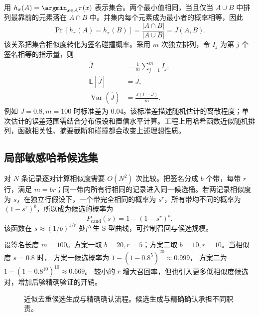 \documentclass[../textbook.tex]{subfiles}
\begin{document}
用 $h_\pi(A)=\argmin_{x\in A}\pi(x)$ 表示集合。两个最小值相同，当且仅当 $A\cup B$ 中排列最靠前的元素落在 $A\cap B$ 中。并集内每个元素成为最小者的概率相等，因此
\begin{equation}
\Pr[h_\pi(A)=h_\pi(B)]=\frac{|A\cap B|}{|A\cup B|}=J(A,B).
\label{eq:data-minhash}
\end{equation}
该关系把集合相似度转化为签名碰撞概率\cite{broder1997resemblance}。采用 $m$ 次独立排列，令 $I_j$ 为第 $j$ 个签名相等的指示量，则
\begin{equation}
 \begin{aligned}
  \widehat J &= \frac{1}{m}\sum_{j=1}^{m}I_j, \\
  \mathbb E[\widehat J] &= J, \\
  \operatorname{Var}(\widehat J) &= \frac{J(1-J)}{m}.
 \end{aligned}
\end{equation}
例如 $J=0.8,m=100$ 时标准差为 $0.04$。该标准差描述随机估计的离散程度；单次估计的误差范围需结合分布假设和置信水平计算。工程上用哈希函数近似随机排列，函数相关性、摘要截断和碰撞都会改变上述理想性质。

\subsection{局部敏感哈希候选集}
对 $N$ 条记录逐对计算相似度需要 $O(N^2)$ 次比较。把签名分成 $b$ 个带，每带 $r$ 行，满足 $m=br$；同一带内所有行相同的记录进入同一候选桶。若两记录相似度为 $s$，在独立行假设下，一个带完全相同的概率为 $s^r$，所有带均不同的概率为 $(1-s^r)^b$，所以成为候选的概率为
\begin{equation}
P_{\mathrm{cand}}(s)=1-(1-s^r)^b.
\label{eq:data-lsh}
\end{equation}
该函数在 $s\approx (1/b)^{1/r}$ 处产生 S 型曲线，可控制召回与候选规模。

\begin{example}[带划分参数对候选概率的影响]
设签名长度 $m=100$。方案一取 $b=20,r=5$；方案二取 $b=10,r=10$。当相似度 $s=0.8$ 时，
方案一候选概率为 $1-(1-0.8^5)^{20}\approx0.999$，
方案二为 $1-(1-0.8^{10})^{10}\approx0.669$。
较小的 $r$ 增大召回率，但也引入更多低相似度候选对，增加后验精确验证的开销。
\end{example}

\begin{figure}[htbp]
\centering
{}
\caption[近似去重候选生成与精确确认流程]{近似去重候选生成与精确确认流程。候选生成与精确确认承担不同职责。}\label{fig:data-lsh}
\end{figure}
\end{document}
